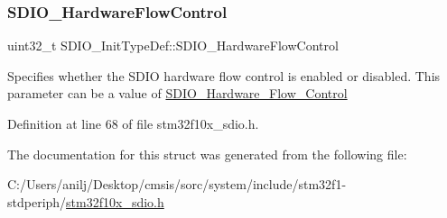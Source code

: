 \mbox{\label{struct_s_d_i_o___init_type_def_a5f57f8aca913de9aed47ef708c05f34f}} 
\subsubsection{\texorpdfstring{S\+D\+I\+O\+\_\+\+Hardware\+Flow\+Control}{SDIO\_HardwareFlowControl}}
{\footnotesize\ttfamily uint32\+\_\+t S\+D\+I\+O\+\_\+\+Init\+Type\+Def\+::\+S\+D\+I\+O\+\_\+\+Hardware\+Flow\+Control}

Specifies whether the S\+D\+IO hardware flow control is enabled or disabled. This parameter can be a value of \hyperlink{group___s_d_i_o___hardware___flow___control}{S\+D\+I\+O\+\_\+\+Hardware\+\_\+\+Flow\+\_\+\+Control} 

Definition at line 68 of file stm32f10x\+\_\+sdio.\+h.



The documentation for this struct was generated from the following file\+:\begin{DoxyCompactItemize}
\item 
C\+:/\+Users/anilj/\+Desktop/cmsis/sorc/system/include/stm32f1-\/stdperiph/\hyperlink{stm32f10x__sdio_8h}{stm32f10x\+\_\+sdio.\+h}\end{DoxyCompactItemize}
